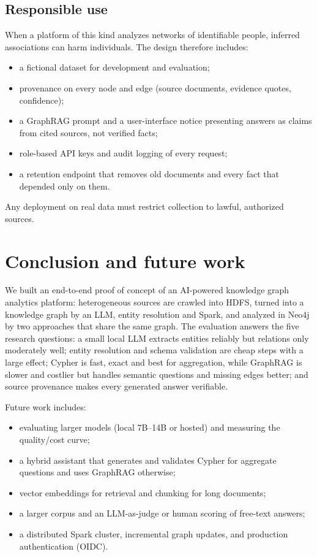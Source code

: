 \documentclass[11pt,a4paper]{report}
\begin{document}
\section{Responsible use}
When a platform of this kind analyzes networks of identifiable people, inferred associations can harm individuals.
The design therefore includes:
\begin{itemize}
  \item a fictional dataset for development and evaluation;
  \item provenance on every node and edge (source documents, evidence quotes, confidence);
  \item a GraphRAG prompt and a user-interface notice presenting answers as claims from cited sources, not verified
        facts;
  \item role-based API keys and audit logging of every request;
  \item a retention endpoint that removes old documents and every fact that depended only on them.
\end{itemize}
Any deployment on real data must restrict collection to lawful, authorized sources.

\chapter{Conclusion and future work}\label{ch:conclusion}
We built an end-to-end proof of concept of an AI-powered knowledge graph analytics platform: heterogeneous sources
are crawled into HDFS, turned into a knowledge graph by an LLM, entity resolution and Spark, and analyzed in Neo4j by
two approaches that share the same graph. The evaluation answers the five research questions: a small local LLM
extracts entities reliably but relations only moderately well; entity resolution and schema validation are cheap
steps with a large effect; Cypher is fast, exact and best for aggregation, while GraphRAG is slower and costlier but
handles semantic questions and missing edges better; and source provenance makes every generated answer verifiable.

Future work includes:
\begin{itemize}
  \item evaluating larger models (local 7B--14B or hosted) and measuring the quality/cost curve;
  \item a hybrid assistant that generates and validates Cypher for aggregate questions and uses GraphRAG otherwise;
  \item vector embeddings for retrieval and chunking for long documents;
  \item a larger corpus and an LLM-as-judge or human scoring of free-text answers;
  \item a distributed Spark cluster, incremental graph updates, and production authentication (OIDC).
\end{itemize}
\end{document}
